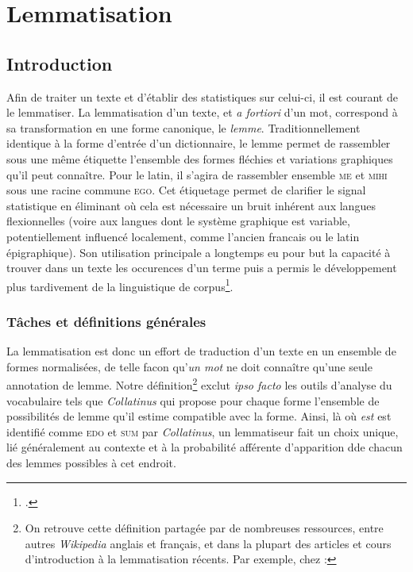 \chapter{Lemmatisation}
\label{sec:lemmatiseurs}

\section{Introduction}
\label{subsec:lemma_intro}

Afin de traiter un texte et d'établir des statistiques sur celui-ci, il est courant de le lemmatiser. La lemmatisation d'un texte, et \textit{a fortiori} d'un mot, correspond à sa transformation en une forme canonique, le \textit{lemme}. Traditionnellement identique à la forme d'entrée d'un dictionnaire, le lemme permet de rassembler sous une même étiquette l'ensemble des formes fléchies et variations graphiques qu'il peut connaître. Pour le latin, il s'agira de rassembler ensemble \textsc{me} et \textsc{mihi} sous une racine commune \textsc{ego}. Cet étiquetage permet de clarifier le signal statistique en éliminant où cela est nécessaire un bruit inhérent aux langues flexionnelles (voire aux langues dont le système graphique est variable, potentiellement influencé localement, comme l'ancien francais ou le latin épigraphique). Son utilisation principale a longtemps eu pour but la capacité à trouver dans un texte les occurences d'un terme puis a permis le développement plus tardivement de la linguistique de corpus\footcite{mellet2002atouts}.

\subsection{Tâches et définitions générales}

La lemmatisation est donc un effort de traduction d'un texte en un ensemble de formes normalisées, de telle facon qu'\textit{un mot} ne doit connaître qu'une seule annotation de lemme. Notre définition\footnote{On retrouve cette définition partagée par de nombreuses ressources, entre autres \textit{Wikipedia} anglais et français, et dans la plupart des articles et cours d'introduction à la lemmatisation récents. Par exemple, chez \textcite{srinidhi_lemmatization_2020}: } exclut \textit{ipso facto} les outils d'analyse du vocabulaire tels que \textit{Collatinus} qui propose pour chaque forme l'ensemble de possibilités de lemme qu'il estime compatible avec la forme. Ainsi, là où \textit{est} est identifié comme \textsc{edo} et \textsc{sum} par \textit{Collatinus}, un lemmatiseur fait un choix unique, lié généralement au contexte et à la probabilité afférente d'apparition dde chacun des lemmes possibles à cet endroit.

